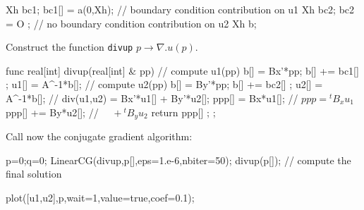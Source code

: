 \documentclass[twoside]{book}
\begin{document}
Xh bc1; bc1[] = a(0,Xh);  //  boundary condition contribution  on u1
Xh bc2; bc2   = O ;       //  no boundary condition contribution on u2
Xh b;
\eFF

Construct the function \texttt{divup} $ p \longrightarrow \nabla. u(p) $.
\bFF

func real[int] divup(real[int] & pp)
{
   //  compute u1(pp)
   b[]  = Bx'*pp; b[] += bc1[] ;    u1[] = A^-1*b[];
   //  compute u2(pp)
   b[]  = By'*pp; b[] += bc2[] ;    u2[] = A^-1*b[];
   //  div(u1,u2) = Bx'*u1[] + By'*u2[];
   ppp[] =   Bx*u1[];   // $  ppp= {}^t B_{x} u_{1} $ 
   ppp[] +=  By*u2[];   // $   \quad   +  {}^t B_{y} u_{2} $ 
   return ppp[] ;
};
\eFF


 Call now the conjugate gradient algorithm:

\bFF

p=0;q=0;
LinearCG(divup,p[],eps=1.e-6,nbiter=50);
divup(p[]); // compute the final solution

plot([u1,u2],p,wait=1,value=true,coef=0.1);
\eFF
\end{document}
